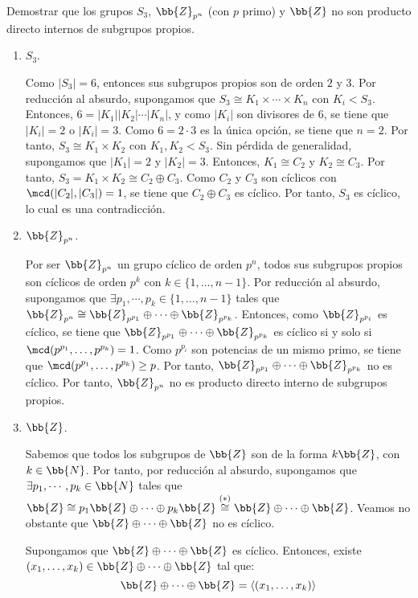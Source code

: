 \begin{ejercicio}
    Demostrar que los grupos $S_3$, $\bb{Z}_{p^n}$ (con $p$ primo) y $\bb{Z}$ no son producto directo internos de subgrupos propios.
    \begin{enumerate}
        \item $S_3$.
        
        Como $|S_3|=6$, entonces sus subgrupos propios son de orden $2$ y $3$. 
        Por reducción al absurdo, supongamos que $S_3\cong K_1\times\cdots\times K_n$ con $K_i<S_3$. Entonces, $6=|K_1||K_2|\cdots|K_n|$, y como $|K_i|$ son divisores de $6$, se tiene que $|K_i|=2$ o $|K_i|=3$. Como $6=2\cdot 3$ es la única opción, se tiene que $n=2$. Por tanto, $S_3\cong K_1\times K_2$ con $K_1,K_2<S_3$. Sin pérdida de generalidad, supongamos que $|K_1|=2$ y $|K_2|=3$. Entonces, $K_1\cong C_2$ y $K_2\cong C_3$. Por tanto, $S_3=K_1\times K_2\cong C_2\oplus C_3$. Como $C_2$ y $C_3$ son cíclicos con $\mcd(|C_2|,|C_3|)=1$, se tiene que $C_2\oplus C_3$ es cíclico. Por tanto, $S_3$ es cíclico, lo cual es una contradicción.

        \item $\bb{Z}_{p^n}$.
        
        Por ser $\bb{Z}_{p^n}$ un grupo cíclico de orden $p^n$, todos sus subgrupos propios son cíclicos de orden $p^k$ con $k\in \{1,\ldots,n-1\}$. Por reducción al absurdo, supongamos que $\exists p_1,\cdots,p_k\in \{1,\ldots,n-1\}$ tales que $\bb{Z}_{p^n}\cong \bb{Z}_{p^{p_1}}\oplus \cdots \oplus \bb{Z}_{p^{p_k}}$. Entonces, como $\bb{Z}_{p^{p_i}}$ es cíclico, se tiene que $\bb{Z}_{p^{p_1}}\oplus \cdots \oplus \bb{Z}_{p^{p_k}}$ es cíclico si y solo si $\mcd(p^{p_1},\ldots,p^{p_k})=1$. Como $p^{p_i}$ son potencias de un mismo primo, se tiene que $\mcd(p^{p_1},\ldots,p^{p_k})\geq p$. Por tanto, $\bb{Z}_{p^{p_1}}\oplus \cdots \oplus \bb{Z}_{p^{p_k}}$ no es cíclico. Por tanto, $\bb{Z}_{p^n}$ no es producto directo interno de subgrupos propios.

        \item $\bb{Z}$.
        
        Sabemos que todos los subgrupos de $\bb{Z}$ son de la forma $k\bb{Z}$, con $k\in \bb{N}$. Por tanto, por reducción al absurdo, supongamos que $\exists p_1,\cdots,p_k\in \bb{N}$ tales que $\bb{Z}\cong p_1\bb{Z}\oplus \cdots \oplus p_k\bb{Z} \stackrel{(\ast)}{\cong} \bb{Z}\oplus \cdots \oplus \bb{Z}$. Veamos no obstante que $\bb{Z}\oplus \cdots \oplus \bb{Z}$ no es cíclico.
        
        Supongamos que $\bb{Z}\oplus \cdots \oplus \bb{Z}$ es cíclico. Entonces, existe $(x_1,\ldots,x_k)\in \bb{Z}\oplus \cdots \oplus \bb{Z}$ tal que:
        \begin{equation*}
            \bb{Z}\oplus \cdots \oplus \bb{Z} = \langle (x_1,\ldots,x_k)\rangle
        \end{equation*}


\end{enumerate}
\end{ejercicio}

